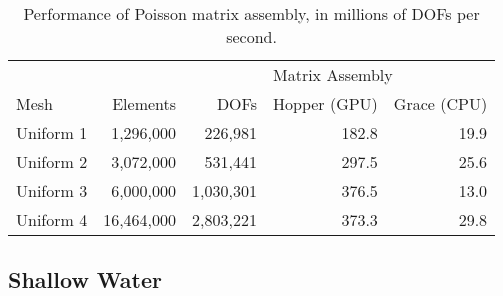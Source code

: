 \begin{table}[t]
    \centering
\begin{tabular}{lrrrr}
\toprule
          &          &             & \multicolumn{2}{l}{Matrix Assembly} \\
                                     \cmidrule(lr){4-5}
Mesh      & Elements & DOFs        & Hopper (GPU) & Grace (CPU) \\
\midrule
Uniform 1 &  1,296,000 &   226,981 & 182.8 & 19.9 \\
Uniform 2 &  3,072,000 &   531,441 & 297.5 & 25.6 \\
Uniform 3 &  6,000,000 & 1,030,301 & 376.5 & 13.0 \\
Uniform 4 & 16,464,000 & 2,803,221 & 373.3 & 29.8 \\
\bottomrule
\end{tabular}
\caption{Performance of Poisson matrix assembly, in millions of DOFs per second.}
    \label{tab:poisson_results}
\end{table}

\subsection*{Shallow Water}

